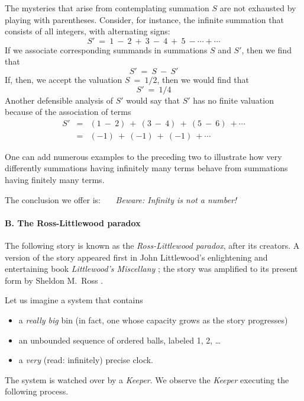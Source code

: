 \medskip

The mysteries that arise from contemplating summation $S$ are not exhausted by playing with parentheses.  Consider, for instance, the infinite summation that consists of all integers, with alternating signs:
\[ S' \ = \ 1 \ - \ 2 \ + \ 3 \ - \ 4 \ + \ 5 \ - \cdots + \cdots \]
If we associate corresponding summands in summations $S$ and $S'$, then we find that
\[ S'  \ = \  S  \ - \ S'  \]
If, then, we accept the valuation $S \ = \ 1/2$, then we would find that
\[ S' \ = \ 1/4 \]
Another defensible analysis of $S'$ would say that $S'$ has no finite valuation because of the association of terms
\begin{eqnarray*}
S' & = & (1 \ - \ 2) \ + \ (3 \ - \ 4) \ + \ (5 \ - \ 6) \ + \cdots \\
    & = & (-1) \ + \ (-1) \ + \ (-1) \ +  \cdots
\end{eqnarray*}

\medskip

One can add numerous examples to the preceding two to illustrate how very differently summations having infinitely many terms behave from summations having finitely many terms.

The conclusion we offer is: \ \ \ {\em Beware:  Infinity is not a number!}

\paragraph{B. The Ross-Littlewood paradox}

  
The following story is known as the {\it Ross-Littlewood paradox}, after its creators.  A version of the story appeared first in John Littlewood's enlightening and entertaining book {\it Littlewood's Miscellany} \cite{Littlewood-misc}; the story was amplified to its present form by Sheldon M.~Ross \cite{Ross76}. 

\medskip

Let us imagine a system that contains
\begin{itemize}
\item
a {\em really big} bin (in fact, one whose capacity grows as the story progresses)

\medskip\item
an unbounded sequence of ordered balls, labeled 1, 2, \ldots

\medskip\item
a {\em very} (read: infinitely) precise clock.
\end{itemize}
The system is watched over by a {\it Keeper}.  We observe the {\it Keeper} executing the following process.

